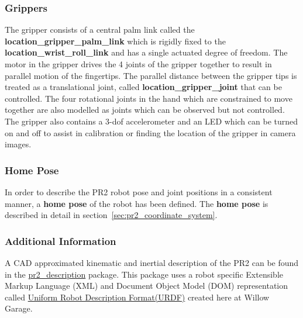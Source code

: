 \subsubsection{Grippers}
The gripper consists of a central palm link called the {\bf location\_gripper\_palm\_link} which is rigidly fixed to the {\bf location\_wrist\_roll\_link} and has a single actuated degree of freedom.  The motor in the gripper drives the 4 joints of the gripper together to result in parallel motion of the fingertips.  The parallel distance between the gripper tips is treated as a translational joint, called {\bf location\_gripper\_joint} that can be controlled.  The four rotational joints in the hand which are constrained to move together are also modelled as joints which can be observed but not controlled.  The gripper also contains a 3-dof accelerometer and an LED which can be turned on and off to assist in calibration or finding the location of the gripper in camera images.

\subsubsection{Home Pose}
In order to describe the PR2 robot pose and joint positions in a consistent manner, a {\bf home pose} of the robot has been defined.  The {\bf home pose} is described in detail in section~\ref{sec:pr2_coordinate_system}.

\subsubsection{Additional Information}
A CAD approximated kinematic and inertial description of the PR2 can be found
  in the \href{http://www.ros.org/wiki/pr2\_description}{pr2\_description} package.
This package uses a robot specific Extensible Markup Language (XML) and Document Object Model (DOM) representation
  called \href{http://www.ros.org/wiki/urdf}{Uniform Robot Description Format(URDF)} created here at Willow Garage.


